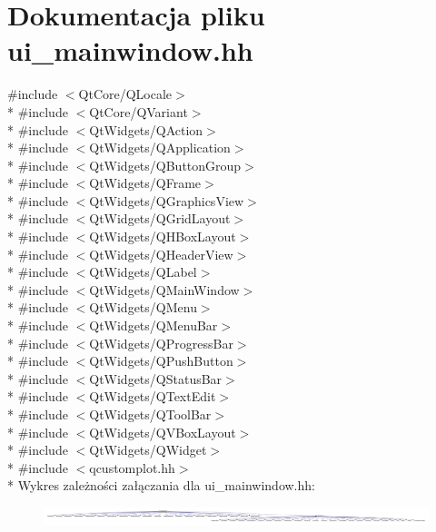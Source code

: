 \hypertarget{ui__mainwindow_8hh}{}\section{Dokumentacja pliku ui\+\_\+mainwindow.\+hh}
\label{ui__mainwindow_8hh}
{\ttfamily \#include $<$Qt\+Core/\+Q\+Locale$>$}\\*
{\ttfamily \#include $<$Qt\+Core/\+Q\+Variant$>$}\\*
{\ttfamily \#include $<$Qt\+Widgets/\+Q\+Action$>$}\\*
{\ttfamily \#include $<$Qt\+Widgets/\+Q\+Application$>$}\\*
{\ttfamily \#include $<$Qt\+Widgets/\+Q\+Button\+Group$>$}\\*
{\ttfamily \#include $<$Qt\+Widgets/\+Q\+Frame$>$}\\*
{\ttfamily \#include $<$Qt\+Widgets/\+Q\+Graphics\+View$>$}\\*
{\ttfamily \#include $<$Qt\+Widgets/\+Q\+Grid\+Layout$>$}\\*
{\ttfamily \#include $<$Qt\+Widgets/\+Q\+H\+Box\+Layout$>$}\\*
{\ttfamily \#include $<$Qt\+Widgets/\+Q\+Header\+View$>$}\\*
{\ttfamily \#include $<$Qt\+Widgets/\+Q\+Label$>$}\\*
{\ttfamily \#include $<$Qt\+Widgets/\+Q\+Main\+Window$>$}\\*
{\ttfamily \#include $<$Qt\+Widgets/\+Q\+Menu$>$}\\*
{\ttfamily \#include $<$Qt\+Widgets/\+Q\+Menu\+Bar$>$}\\*
{\ttfamily \#include $<$Qt\+Widgets/\+Q\+Progress\+Bar$>$}\\*
{\ttfamily \#include $<$Qt\+Widgets/\+Q\+Push\+Button$>$}\\*
{\ttfamily \#include $<$Qt\+Widgets/\+Q\+Status\+Bar$>$}\\*
{\ttfamily \#include $<$Qt\+Widgets/\+Q\+Text\+Edit$>$}\\*
{\ttfamily \#include $<$Qt\+Widgets/\+Q\+Tool\+Bar$>$}\\*
{\ttfamily \#include $<$Qt\+Widgets/\+Q\+V\+Box\+Layout$>$}\\*
{\ttfamily \#include $<$Qt\+Widgets/\+Q\+Widget$>$}\\*
{\ttfamily \#include $<$qcustomplot.\+hh$>$}\\*
Wykres zależności załączania dla ui\+\_\+mainwindow.\+hh\+:\nopagebreak
\begin{figure}[H]
\begin{center}
\leavevmode
\includegraphics[width=350pt]{ui__mainwindow_8hh__incl}
\end{center}
\end{figure}
